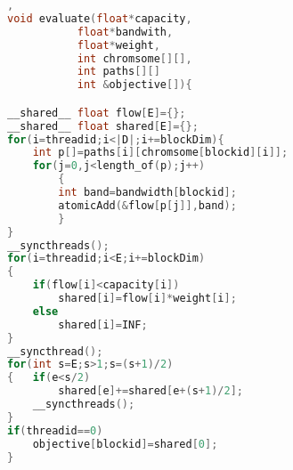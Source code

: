 \documentclass{article}
\begin{document}
 
\begin{lstlisting}[language=C],
void evaluate(float*capacity,
		   float*bandwith,
		   float*weight,
		   int chromsome[][],
		   int paths[][]
		   int &objective[]){

__shared__ float flow[E]={};
__shared__ float shared[E]={};
for(i=threadid;i<|D|;i+=blockDim){
	int p[]=paths[i][chromsome[blockid][i]];
	for(j=0,j<length_of(p);j++)
		{
		int band=bandwidth[blockid];
		atomicAdd(&flow[p[j]],band);
		}		
}
__syncthreads();
for(i=threadid;i<E;i+=blockDim)
{
	if(flow[i]<capacity[i])
		shared[i]=flow[i]*weight[i];	
	else
		shared[i]=INF;	
}
__syncthread();
for(int s=E;s>1;s=(s+1)/2)
{	if(e<s/2)
		shared[e]+=shared[e+(s+1)/2];
	__syncthreads();
}
if(threadid==0)
	objective[blockid]=shared[0];
}
\end{lstlisting}
\end{document}
